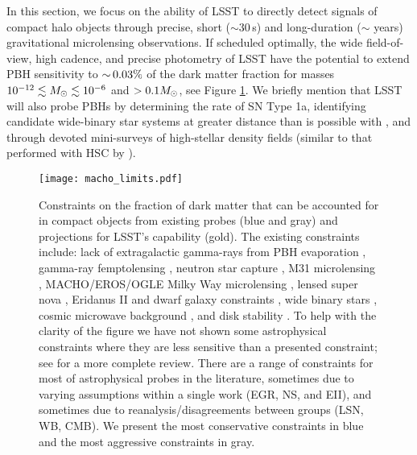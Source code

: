In this section, we focus on the ability of LSST to directly detect signals of compact halo objects through precise, short ($\sim30\,$s) and long-duration ($\sim$ years) gravitational microlensing observations.
If scheduled optimally, the wide field-of-view, high cadence, and precise photometry of LSST have the potential to extend PBH sensitivity to $ {\sim}\, 0.03\%$ of the dark matter fraction for masses $10^{-12}\lesssim M_\odot \lesssim 10^{-6}$ and $>0.1M_\odot$, see Figure \ref{fig:macho_constraints}.
We briefly mention that LSST will also probe PBHs by determining the rate of SN Type 1a, identifying candidate wide-binary star systems at greater distance than is possible with \Gaia, and through devoted mini-surveys of high-stellar density fields (similar to that performed with HSC by \citealt{1701.02151}).

\begin{figure}[t]
\label{fig:macho_constraints}
\centering
\texttt{[image: macho\_limits.pdf]}
\caption{
    Constraints on the fraction of dark matter that can be accounted for in compact objects from existing probes (blue and gray) and projections for LSST's capability (gold).
    The existing constraints include: lack of extragalactic gamma-rays from PBH evaporation \citep[EGR][]{PhysRevD.81.104019, PhysRevD.94.044029}, gamma-ray femptolensing \citep[GF][]{PhysRevD.86.043001}, neutron star capture \citep[NS][]{PhysRevD.87.123524}, M31 microlensing \citep[M31ML][]{2017arXiv170102151N}, MACHO/EROS/OGLE Milky Way microlensing \citep[MWML][]{10.1051/0004-6361:20066017, 2001ApJ...550L.169A, 2009MNRAS.397.1228W}, lensed super nova \citep[LSN][]{PhysRevLett.121.141101, arxiv:1712.06574v1}, Eridanus II and dwarf galaxy constraints \citep[EII][]{2016ApJ...824L..31B, arxiv:1611.05052v2}, wide binary stars \citep[WB][]{2009MNRAS.396L..11Q, 2004ApJ...601..311Y}, cosmic microwave background \citep[CMB][]{2017PhRvD..95d3534A, 2008ApJ...680..829R}, and disk stability \citep[DS][]{1985ApJ...299..633L, 1994ApJ...437..184X}.
    To help with the clarity of the figure we have not shown some astrophysical constraints where they are less sensitive than a presented constraint; see \citet{2016PhRvD..94h3504C} for a more complete review.
    There are a range of constraints for most of astrophysical probes in the literature, sometimes due to varying assumptions within a single work (EGR, NS, and EII), and sometimes due to reanalysis/disagreements between groups (LSN, WB, CMB).
    We present the most conservative constraints in blue and the most aggressive constraints in gray.
}
\end{figure}
